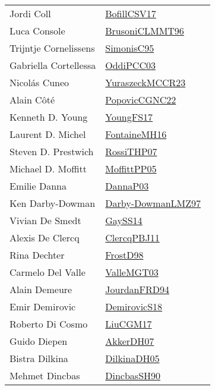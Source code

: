 {\begin{longtable}{p{4cm}p{20cm}}
Jordi Coll & \href{works/BofillCSV17.pdf}{BofillCSV17}~\cite{BofillCSV17}\\
Luca Console & \href{works/BrusoniCLMMT96.pdf}{BrusoniCLMMT96}~\cite{BrusoniCLMMT96}\\
Trijntje Cornelissens & \href{works/SimonisC95.pdf}{SimonisC95}~\cite{SimonisC95}\\
Gabriella Cortellessa & \href{works/OddiPCC03.pdf}{OddiPCC03}~\cite{OddiPCC03}\\
Nicol{\'{a}}s Cuneo & \href{works/YuraszeckMCCR23.pdf}{YuraszeckMCCR23}~\cite{YuraszeckMCCR23}\\
Alain C{\^{o}}t{\'{e}} & \href{works/PopovicCGNC22.pdf}{PopovicCGNC22}~\cite{PopovicCGNC22}\\
Kenneth D. Young & \href{works/YoungFS17.pdf}{YoungFS17}~\cite{YoungFS17}\\
Laurent D. Michel & \href{works/FontaineMH16.pdf}{FontaineMH16}~\cite{FontaineMH16}\\
Steven D. Prestwich & \href{works/RossiTHP07.pdf}{RossiTHP07}~\cite{RossiTHP07}\\
Michael D. Moffitt & \href{works/MoffittPP05.pdf}{MoffittPP05}~\cite{MoffittPP05}\\
Emilie Danna & \href{works/DannaP03.pdf}{DannaP03}~\cite{DannaP03}\\
Ken Darby{-}Dowman & \href{works/Darby-DowmanLMZ97.pdf}{Darby-DowmanLMZ97}~\cite{Darby-DowmanLMZ97}\\
Vivian De Smedt & \href{works/GaySS14.pdf}{GaySS14}~\cite{GaySS14}\\
Alexis De Clercq & \href{works/ClercqPBJ11.pdf}{ClercqPBJ11}~\cite{ClercqPBJ11}\\
Rina Dechter & \href{works/FrostD98.pdf}{FrostD98}~\cite{FrostD98}\\
Carmelo Del Valle & \href{works/ValleMGT03.pdf}{ValleMGT03}~\cite{ValleMGT03}\\
Alain Demeure & \href{}{JourdanFRD94}~\cite{JourdanFRD94}\\
Emir Demirovic & \href{works/DemirovicS18.pdf}{DemirovicS18}~\cite{DemirovicS18}\\
Roberto Di Cosmo & \href{works/LiuCGM17.pdf}{LiuCGM17}~\cite{LiuCGM17}\\
Guido Diepen & \href{works/AkkerDH07.pdf}{AkkerDH07}~\cite{AkkerDH07}\\
Bistra Dilkina & \href{works/DilkinaDH05.pdf}{DilkinaDH05}~\cite{DilkinaDH05}\\
Mehmet Dincbas & \href{works/DincbasSH90.pdf}{DincbasSH90}~\cite{DincbasSH90}\\

\end{longtable}}
